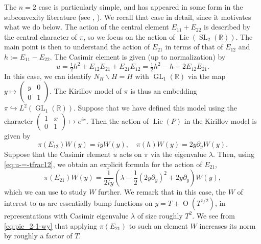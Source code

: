 \documentclass[reqno]{amsart}
\DeclareMathOperator{\SL}{SL}
\DeclareMathOperator{\GL}{GL}
\DeclareMathOperator{\Lie}{Lie}
\def\O{\operatorname{O}}
\theoremstyle{plain} \newtheorem{theorem} {Theorem}
\theoremstyle{definition} \newtheorem{definition} [theorem] {Definition}
\theoremstyle{itplain} %
\numberwithin{equation}{section}
\numberwithin{theorem}{section}
\begin{document}
The $n=2$ case is particularly simple, and has appeared in some form in the subconvexity literature (see \cite[Lemma 8.4]{venkatesh-2005}, \cite[\S3.2.5]{michel-2009}).  We recall that case in detail, since it motivates what we do below.  The action of the central element $E_{1 1} + E_{2 2}$ is described by the central character of $\pi$, so we focus on the action of $\Lie(\SL_2(\mathbb{R}))$.  The main point is then to understand the action of $E_{2 1}$ in terms of that of $E_{12}$ and $h := E_{1 1} - E_{2 2}$.  The Casimir element is given (up to normalization) by
\begin{equation}\label{eq:u-=-tfrac12}
  u = \tfrac{1}{2} h^2 + E_{12} E_{21} + E_{2 1} E_{1 2}
  =\tfrac{1}{2}  h^2 - h + 2 E_{12} E_{21}.
\end{equation}
In this case, we can identify $N_H \backslash H = H$ with $\GL_1(\mathbb{R})$ via the map $y \mapsto \begin{pmatrix}
  y & 0 \\
  0 & 1
\end{pmatrix}$.  The Kirillov model of $\pi$ is thus an embedding $\pi \hookrightarrow L^2(\GL_1(\mathbb{R}))$.  Suppose that we have defined this model using the character $\begin{pmatrix}
  1 & x \\
  0 & 1
\end{pmatrix} \mapsto e^{i x}$.  Then the action of $\Lie(P)$ in the Kirillov model is given by
\begin{equation*}
  \pi(E_{12}) W(y) = i y W(y),
  \quad
  \pi(h) W(y) = 2 y \partial_y W(y).
\end{equation*}
Suppose that the Casimir element $u$ acts on $\pi$ via the eigenvalue $\lambda$.  Then, using \eqref{eq:u-=-tfrac12}, we obtain an explicit formula for the action of $E_{2 1}$,
\begin{equation}\label{eq:pie_2-1-wy}
  \pi(E_{2 1}) W(y) =
  \frac{1}{ 2 i y} \left(
    \lambda - \frac{1}{2} (2 y \partial_y)^2 + 2 y \partial_y
  \right) W(y),
\end{equation}
which we can use to study $W$ further.  We remark that in this case, the $W$ of interest to us are essentially bump functions on $y = T + \O(T^{1/2})$, in representations with Casimir eigenvalue $\lambda$ of size roughly $T^2$.  We see from \eqref{eq:pie_2-1-wy} that applying $\pi(E_{21 })$ to such an element $W$ increases its norm by roughly a factor of $T$.
\end{document}

